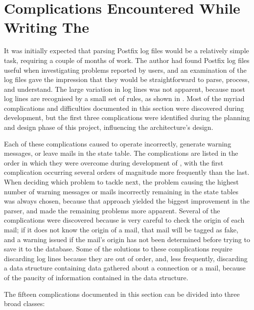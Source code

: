 \section{Complications Encountered While Writing The \parsernamelong{}}

\label{complications}

It was initially expected that parsing Postfix log files would be a
relatively simple task, requiring a couple of months of work.  The author
had found Postfix log files useful when investigating problems reported by
users, and an examination of the log files gave the impression that they
would be straightforward to parse, process, and understand.  The large
variation in log lines was not apparent, because most log lines are
recognised by a small set of rules, as shown in .  Most of the myriad complications and difficulties documented in
this section were discovered during \parsernames{} development, but the
first three complications were identified during the planning and design
phase of this project, influencing the architecture's design.

Each of these complications caused \parsername{} to operate incorrectly,
generate warning messages, or leave mails in the state table.  The
complications are listed in the order in which they were overcome during
development of \parsername{}, with the first complication occurring several
orders of magnitude more frequently than the last.  When deciding which
problem to tackle next, the problem causing the highest number of warning
messages or mails incorrectly remaining in the state tables was always
chosen, because that approach yielded the biggest improvement in the
parser, and made the remaining problems more apparent.  Several of the
complications were discovered because \parsername{} is very careful to
check the origin of each mail; if it does not know the origin of a mail,
that mail will be tagged as fake, and a warning issued if the mail's origin
has not been determined before trying to save it to the database.  Some of
the solutions to these complications require discarding log lines because
they are out of order, and, less frequently, discarding a data structure
containing data gathered about a connection or a mail, because of the
paucity of information contained in the data structure.

The fifteen complications documented in this section can be divided into
three broad classes:

